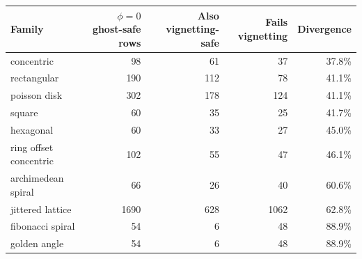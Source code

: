 \begin{tabular}{lrrrr}
\toprule Family & $\phi{=}0$ ghost-safe rows & Also vignetting-safe & Fails vignetting & Divergence \\ \midrule
concentric & 98 & 61 & 37 & 37.8\% \\
rectangular & 190 & 112 & 78 & 41.1\% \\
poisson disk & 302 & 178 & 124 & 41.1\% \\
square & 60 & 35 & 25 & 41.7\% \\
hexagonal & 60 & 33 & 27 & 45.0\% \\
ring offset concentric & 102 & 55 & 47 & 46.1\% \\
archimedean spiral & 66 & 26 & 40 & 60.6\% \\
jittered lattice & 1690 & 628 & 1062 & 62.8\% \\
fibonacci spiral & 54 & 6 & 48 & 88.9\% \\
golden angle & 54 & 6 & 48 & 88.9\% \\
\bottomrule \end{tabular}
